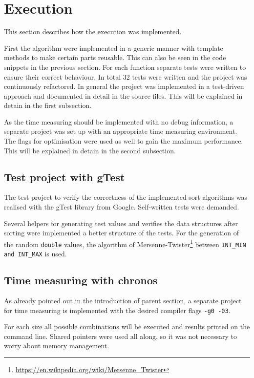 \documentclass[11pt]{amsart}
\begin{document}
\newpage
\section{Execution}
This section describes how the execution was implemented. 

First the algorithm were implemented in a generic manner with template methods to make certain parts reusable. This can also be seen in the code snippets in the previous section. For each function separate tests were written to ensure their correct behaviour. In total 32 tests were written and the project was continuously refactored. In general the project was implemented in a test-driven approach and documented in detail in the source files. This will be explained in detain in the first subsection.

As the time measuring should be implemented with no debug information, a separate project was set up with an appropriate time measuring environment. The flags for optimisation were used as well to gain the maximum performance. This will be explained in detain in the second subsection.

%
%
\subsection{Test project with gTest}
The test project to verify the correctness of the implemented sort algorithms was realised with the gTest library from Google. Self-written tests were demanded. 

Several helpers for generating test values and verifies the data structures after sorting were implemented a better structure of the tests. For the generation of the random \texttt{double} values, the algorithm of Mersenne-Twister\footnote{\url{https://en.wikipedia.org/wiki/Mersenne_Twister}} between \texttt{INT\_MIN and INT\_MAX} is used.
%
%
\subsection{Time measuring with chronos}
As already pointed out in the introduction of parent section, a separate project for time measuring is implemented with the desired compiler flags \texttt{-g0 -03}. 

For each size all possible combinations will be executed and results printed on the command line. Shared pointers were used all along, so it was not necessary to worry about memory management.
\end{document}
